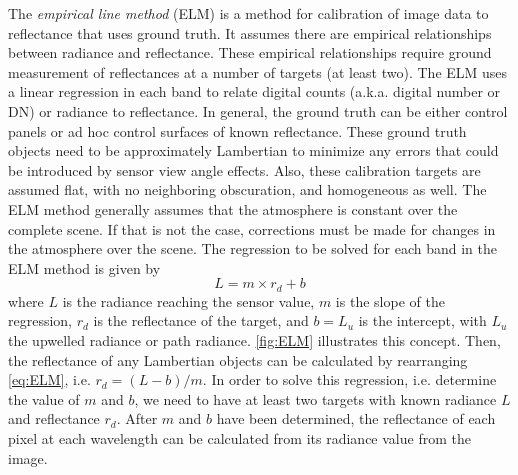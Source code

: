 \documentclass[]{spie}  %
\begin{document}
The {\it empirical line method} (ELM) is a method for calibration of image data to reflectance that uses ground truth. It assumes there are empirical relationships between radiance and reflectance. These empirical relationships require ground measurement of reflectances at a number of targets\cite{Smith:1999} (at least two). The ELM uses a linear regression in each band to relate digital counts (a.k.a. digital number or DN) or radiance to reflectance\cite{Schott}. In general, the ground truth can be either control panels or ad hoc control surfaces of known reflectance. These ground truth objects need to be approximately Lambertian to minimize any errors that could be introduced by sensor view angle effects. Also, these calibration targets are assumed flat, with no neighboring obscuration, and homogeneous as well. The ELM method generally assumes that the atmosphere is constant over the complete scene. If that is not the case, corrections must be made for changes in the atmosphere over the scene. The regression to be solved for each band in the ELM method is given by
\begin{equation}
	\label{eq:ELM} 
	L = m\times r_d + b
\end{equation}
where $L$ is the radiance reaching the sensor value, $m$ is the slope of the regression, $r_d$ is the reflectance of the target, and $b=L_u$ is the intercept, with $L_u$ the upwelled radiance or path radiance. \autoref{fig:ELM} illustrates this concept. Then, the reflectance of any Lambertian objects can be calculated by rearranging \autoref{eq:ELM}, i.e. $r_d=(L-b)/m$. In order to solve this regression, i.e. determine the value of $m$ and $b$, we need to have at least two targets with known radiance $L$ and reflectance $r_d$. After $m$ and $b$ have been determined, the reflectance of each pixel at each wavelength can be calculated from its radiance value from the image.
\end{document}
